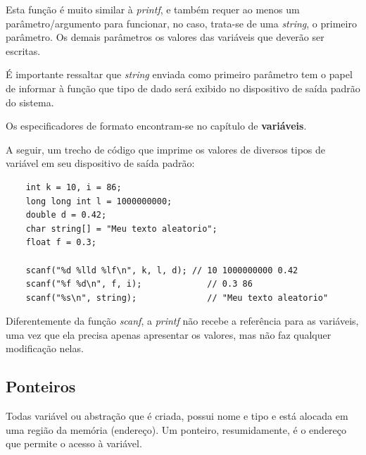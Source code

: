 \documentclass[12pt]{article}
\newcommand\tab[1][1cm]{\hspace*{#1}}
\begin{document}
\par\tab Esta função é muito similar à \textit{printf}, e também requer ao menos um parâmetro/argumento para funcionar, no caso, trata-se de uma \textit{string}, o primeiro parâmetro. Os demais parâmetros os valores das variáveis que deverão ser escritas.

\par\tab É importante ressaltar que \textit{string} enviada como primeiro parâmetro tem o papel de informar à função que tipo de dado será exibido no dispositivo de saída padrão do sistema.

\hspace{0.25cm}
\begin{tcolorbox}[colback=violet!5!white,colframe=violet!75!black,title=Dica!]
  \par\tab Os especificadores de formato encontram-se no capítulo de \textbf{variáveis}.
\end{tcolorbox}

\par\tab A seguir, um trecho de código que imprime os valores de diversos tipos de variável em seu dispositivo de saída padrão:

\hspace{0.25cm}
\begin{lstlisting}
    int k = 10, i = 86;
    long long int l = 1000000000;
    double d = 0.42;
    char string[] = "Meu texto aleatorio";
    float f = 0.3;
    
    scanf("%d %lld %lf\n", k, l, d); // 10 1000000000 0.42
    scanf("%f %d\n", f, i);             // 0.3 86
    scanf("%s\n", string);              // "Meu texto aleatorio"
\end{lstlisting}

\hspace{0.25cm}
\begin{tcolorbox}[colback=yellow!5!white,colframe=yellow!75!black,title=Atenção!]
  \par\tab Diferentemente da função \textit{scanf}, a \textit{printf} não recebe a referência para as variáveis, uma vez que ela precisa apenas apresentar os valores, mas não faz qualquer modificação nelas.
\end{tcolorbox}

\newpage

\subsection{Ponteiros}

\par\tab Todas variável ou abstração que é criada, possui nome e tipo e está alocada em uma região da memória (endereço). Um ponteiro, resumidamente, é o endereço que permite o acesso à variável.\cite{presentation:poo_into_cpp}
\end{document}
